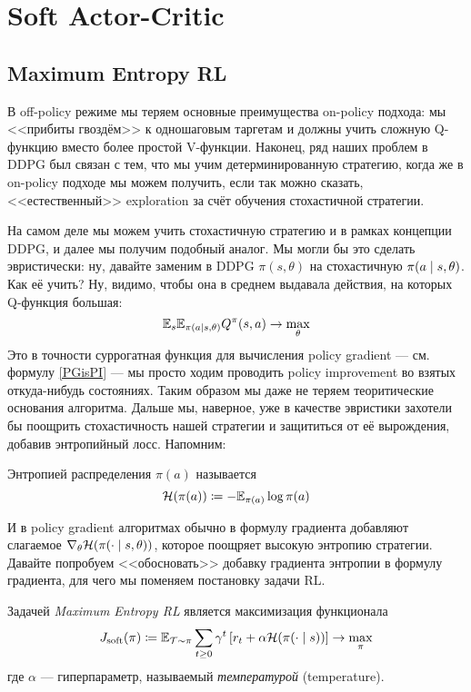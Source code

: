 \section{Soft Actor-Critic}\label{SACsection}

\subsection{Maximum Entropy RL}\label{maximumentropyrlsubsection}

В off-policy режиме мы теряем основные преимущества on-policy подхода: мы <<прибиты гвоздём>> к одношаговым таргетам и должны учить сложную Q-функцию вместо более простой V-функции. Наконец, ряд наших проблем в DDPG был связан с тем, что мы учим детерминированную стратегию, когда же в on-policy подходе мы можем получить, если так можно сказать, <<естественный>> exploration за счёт обучения стохастичной стратегии.

На самом деле мы можем учить стохастичную стратегию и в рамках концепции DDPG, и далее мы получим подобный аналог. Мы могли бы это сделать эвристически: ну, давайте заменим в DDPG $\pi(s, \theta)$ на стохастичную $\pi(a \HM\mid s, \theta)$. Как её учить? Ну, видимо, чтобы она в среднем выдавала действия, на которых Q-функция большая:
$$\mathbb{E}_s \mathbb{E}_{\pi(a \mid s, \theta)} Q^{\pi}(s, a) \to \max_{\theta}$$
Это в точности суррогатная функция для вычисления policy gradient --- см. формулу \eqref{PGisPI} --- мы просто ходим проводить policy improvement во взятых откуда-нибудь состояниях. Таким образом мы даже не теряем теоритические основания алгоритма. Дальше мы, наверное, уже в качестве эвристики захотели бы поощрить стохастичность нашей стратегии и защититься от её вырождения, добавив энтропийный лосс. Напомним:

\begin{definition}
Энтропией распределения $\pi(a)$ называется
$$\mathcal{H}(\pi(a)) \coloneqq - \mathbb{E}_{\pi(a)} \log \pi(a)$$
\end{definition}

И в policy gradient алгоритмах обычно в формулу градиента добавляют слагаемое $\nabla_{\theta} \mathcal{H}(\pi(\cdot \mid s, \theta))$, которое поощряет высокую энтропию стратегии. Давайте попробуем <<обосновать>> добавку градиента энтропии в формулу градиента, для чего мы поменяем постановку задачи RL.

\begin{definition}
Задачей \emph{Maximum Entropy RL} является максимизация функционала
\begin{equation}\label{merl}
    J_{\mathrm{soft}}(\pi) \coloneqq \mathbb{E}_{\mathcal{T} \sim \pi} \sum_{t \ge 0} \gamma^t \left[ r_t + \alpha \mathcal{H}(\pi(\cdot \mid s)) \right] \to \max_\pi
\end{equation}
где $\alpha$ --- гиперпараметр, называемый \emph{температурой} (temperature).
\end{definition}

